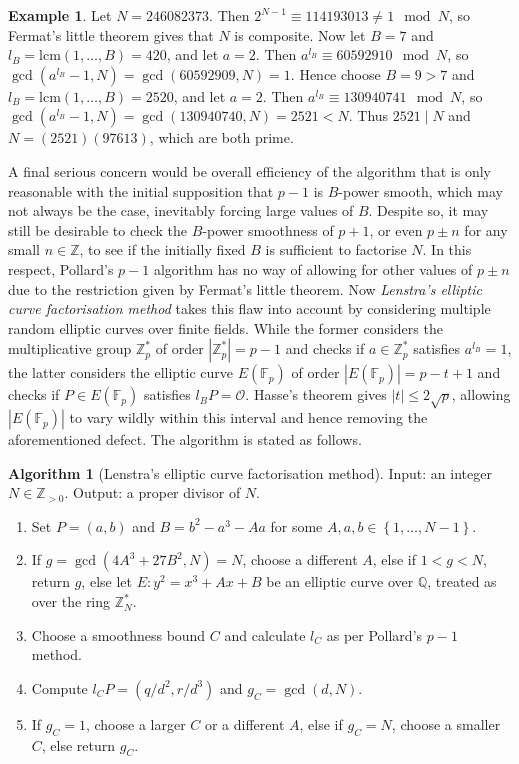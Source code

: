 \documentclass{article}
\newcommand{\F}{\mathbb{F}}
\newcommand{\Z}{\mathbb{Z}}
\newcommand{\Q}{\mathbb{Q}}
\newcommand{\rb}[1]{\left( #1 \right)}
\newcommand{\cb}[1]{\left\{ #1 \right\}}
\newcommand{\abs}[1]{\left\lvert #1 \right\rvert}
\theoremstyle{definition}
\newtheorem*{example}{Example}
\newtheorem{algorithm}[proposition]{Algorithm}
\begin{document}
\begin{example}
Let $ N = 246082373 $. Then $ 2^{N - 1} \equiv 114193013 \ne 1 \mod N $, so Fermat's little theorem gives that $ N $ is composite. Now let $ B = 7 $ and $ l_B = \text{lcm}\rb{1, \dots, B} = 420 $, and let $ a = 2 $. Then $ a^{l_B} \equiv 60592910 \mod N $, so $ \gcd\rb{a^{l_B} - 1, N} = \gcd\rb{60592909, N} = 1 $. Hence choose $ B = 9 > 7 $ and $ l_B = \text{lcm}\rb{1, \dots, B} = 2520 $, and let $ a = 2 $. Then $ a^{l_B} \equiv 130940741 \mod N $, so $ \gcd\rb{a^{l_B} - 1, N} = \gcd\rb{130940740, N} = 2521 < N $. Thus $ 2521 \mid N $ and $ N = \rb{2521}\rb{97613} $, which are both prime.
\end{example}

A final serious concern would be overall efficiency of the algorithm that is only reasonable with the initial supposition that $ p - 1 $ is $ B $-power smooth, which may not always be the case, inevitably forcing large values of $ B $. Despite so, it may still be desirable to check the $ B $-power smoothness of $ p + 1 $, or even $ p \pm n $ for any small $ n \in \Z $, to see if the initially fixed $ B $ is sufficient to factorise $ N $. In this respect, Pollard's $ p - 1 $ algorithm has no way of allowing for other values of $ p \pm n $ due to the restriction given by Fermat's little theorem. Now \emph{Lenstra's elliptic curve factorisation method} takes this flaw into account by considering multiple random elliptic curves over finite fields. While the former considers the multiplicative group $ \Z_p^* $ of order $ \abs{\Z_p^*} = p - 1 $ and checks if $ a \in \Z_p^* $ satisfies $ a^{l_B} = 1 $, the latter considers the elliptic curve $ E\rb{\F_p} $ of order $ \abs{E\rb{\F_p}} = p - t + 1 $ and checks if $ P \in E\rb{\F_p} $ satisfies $ l_BP = \mathcal{O} $. Hasse's theorem gives $ \abs{t} \le 2\sqrt{p} $, allowing $ \abs{E\rb{\F_p}} $ to vary wildly within this interval and hence removing the aforementioned defect. The algorithm is stated as follows.

\begin{algorithm}[Lenstra's elliptic curve factorisation method]
Input: an integer $ N \in \Z_{> 0} $. Output: a proper divisor of $ N $.
\begin{enumerate}
\item Set $ P = \rb{a, b} $ and $ B = b^2 - a^3 - Aa $ for some $ A, a, b \in \cb{1, \dots, N - 1} $.
\item If $ g = \gcd\rb{4A^3 + 27B^2, N} = N $, choose a different $ A $, else if $ 1 < g < N $, return $ g $, else let $ E : y^2 = x^3 + Ax + B $ be an elliptic curve over $ \Q $, treated as over the ring $ \Z_N^* $.
\item Choose a smoothness bound $ C $ and calculate $ l_C $ as per Pollard's $ p - 1 $ method.
\item Compute $ l_CP = \rb{q / d^2, r / d^3} $ and $ g_C = \gcd\rb{d, N} $.
\item If $ g_C = 1 $, choose a larger $ C $ or a different $ A $, else if $ g_C = N $, choose a smaller $ C $, else return $ g_C $.
\end{enumerate}
\end{algorithm}
\end{document}
